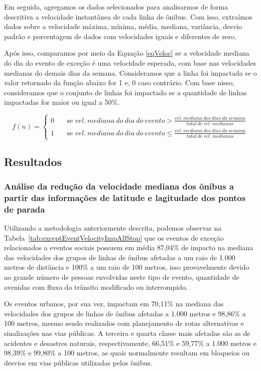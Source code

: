 \documentclass[
	12pt,				%
	oneside,			%
	a4paper,			%
	english,			%
	brazil				%
	]{abntex2ppgsi}
\begin{document}
{{{Em seguida, agregamos os dados selecionados para analisarmos  de forma descritiva a velocidade instantânea de cada linha de ônibus. Com isso, extraímos dados sobre a velocidade máxima, mínima, média, mediana, variância, desvio padrão e porcentagem de dados com velocidades iguais e diferentes de zero. 

Após isso, comparamos por meio da Equação \ref{eqVeloc} se a velocidade mediana do dia do evento de exceção é uma velocidade esperada, com base nas velocidades medianas do demais dias da semana.  Consideramos que a linha foi impactada se o valor retornado da função abaixo for 1 e, 0 caso contrário. Com base nisso, consideramos que o conjunto de linhas foi impactado se a quantidade de linhas impactadas for maior ou igual a 50\%.

\begin{equation}
\label{eqVeloc}
 f(n) =
  \begin{cases}
    0      & \quad \text{se }  vel.~mediana~do~dia~do~evento > \frac{vel.~mediana~dos~dias~da~semana}{total~de~vel.~medianas}\\
    1 & \quad \text{se } vel.~mediana~do~dia~do~evento \leq \frac{vel.~mediana~dos~dias~da~semana}{total~de~vel.~medianas}
  \end{cases}
\end{equation}

\subsection{Resultados}

\subsubsection{Análise da redução da velocidade mediana dos ônibus a partir das informações de latitude e lagitudade dos pontos de parada}
\label{stopsAnalysis}

Utilizando a metodologia anteriormente descrita, podemos observar na Tabela~\ref{tab:exceptEventVelocityImpAllStop} que os eventos de exceção relacionados a eventos sociais possuem em média 87,04\% de impacto na mediana das velocidades dos grupos de linhas de ônibus afetadas a um raio de 1.000 metros de distância e 100\% a um raio de 100 metros, isso provavelmente devido ao grande número de pessoas envolvidas neste tipo de evento, quantidade de avenidas com fluxo do trânsito modificado ou interrompido.

Os eventos urbanos, por sua vez, impactam em 70,11\% na mediana das velocidades dos grupos de linhas de ônibus afetadas a 1.000 metros e 98,86\% a 100 metros, mesmo sendo realizados com planejamento de rotas alternativas e sinalizações nas vias públicas. A terceira e quarta classe mais afetadas são as de acidentes e desastres naturais, respectivamente, 66,51\% e 59,77\% a 1.000 metros e 98,39\% e 99,80\% a 100 metros, as quais normalmente resultam em bloqueios ou desvios em vias públicas utilizadas pelos ônibus.

}}}
\end{document}
